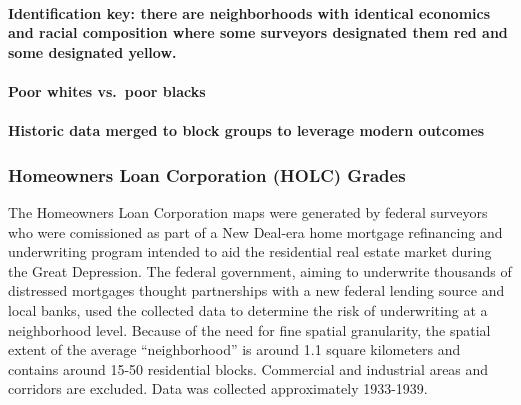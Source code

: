 \documentclass[
]{article}
\begin{document}
\hypertarget{identification-key-there-are-neighborhoods-with-identical-economics-and-racial-composition-where-some-surveyors-designated-them-red-and-some-designated-yellow.}{%
\paragraph{Identification key: there are neighborhoods with identical economics and racial composition where some surveyors designated them red and some designated yellow.}\label{identification-key-there-are-neighborhoods-with-identical-economics-and-racial-composition-where-some-surveyors-designated-them-red-and-some-designated-yellow.}}

\hypertarget{poor-whites-vs.-poor-blacks}{%
\paragraph{Poor whites vs.~poor blacks}\label{poor-whites-vs.-poor-blacks}}

\hypertarget{historic-data-merged-to-block-groups-to-leverage-modern-outcomes}{%
\paragraph{Historic data merged to block groups to leverage modern outcomes}\label{historic-data-merged-to-block-groups-to-leverage-modern-outcomes}}

\hypertarget{homeowners-loan-corporation-holc-grades}{%
\subsubsection{Homeowners Loan Corporation (HOLC) Grades}\label{homeowners-loan-corporation-holc-grades}}

The Homeowners Loan Corporation maps were generated by federal surveyors who were comissioned as part of a New Deal-era home mortgage refinancing and underwriting program intended to aid the residential real estate market during the Great Depression. The federal government, aiming to underwrite thousands of distressed mortgages thought partnerships with a new federal lending source and local banks, used the collected data to determine the risk of underwriting at a neighborhood level. Because of the need for fine spatial granularity, the spatial extent of the average ``neighborhood'' is around 1.1 square kilometers and contains around 15-50 residential blocks. Commercial and industrial areas and corridors are excluded. Data was collected approximately 1933-1939.
\end{document}
